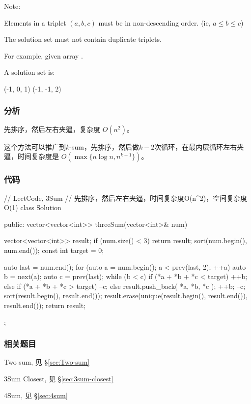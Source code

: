 Note:
\begindot
\item Elements in a triplet $(a,b,c)$ must be in non-descending order. (ie, $a 
\leq b \leq c$)
\item The solution set must not contain duplicate triplets.
\myenddot

For example, given array .

A solution set is:
\begin{Code}
	(-1, 0, 1)
	(-1, -1, 2)
\end{Code}


\subsubsection{分析}
先排序，然后左右夹逼，复杂度 $O(n^2)$。

这个方法可以推广到$k$-sum，先排序，然后做$k-2$次循环，在最内层循环左右夹逼，时间复杂度是 
$O(\max\{n \log n, n^{k-1}\})$。


\subsubsection{代码}
\begin{Code}
	// LeetCode, 3Sum
	// 先排序，然后左右夹逼，时间复杂度O(n^2)，空间复杂度O(1)
	class Solution {
		public:
		vector<vector<int>> threeSum(vector<int>& num) {
			vector<vector<int>> result;
			if (num.size() < 3) return result;
			sort(num.begin(), num.end());
			const int target = 0;
			
			auto last = num.end();
			for (auto a = num.begin(); a < prev(last, 2); ++a) {
				auto b = next(a);
				auto c = prev(last);
				while (b < c) {
					if (*a + *b + *c < target) {
						++b;
					} else if (*a + *b + *c > target) {
					--c;
				} else {
				result.push_back({ *a, *b, *c });
				++b;
				--c;
			}
		}
	}
	sort(result.begin(), result.end());
	result.erase(unique(result.begin(), result.end()), result.end());
	return result;
}
};
\end{Code}


\subsubsection{相关题目}
\begindot
\item Two sum, 见 \S \ref{sec:Two-sum}
\item 3Sum Closest, 见 \S \ref{sec:3sum-closest}
\item 4Sum, 见 \S \ref{sec:4sum}
\myenddot

